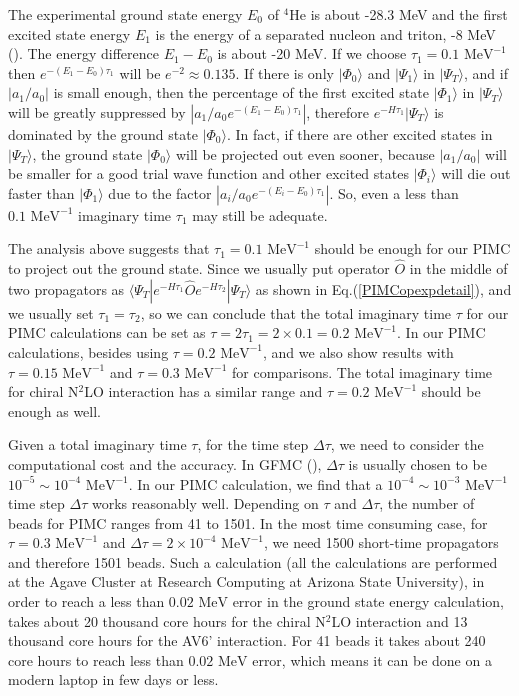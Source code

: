 \documentclass[12pt,letterpaper,UTF8]{report}
\begin{document}
The experimental ground state energy $E_0$ of $^4$He is about -28.3 MeV and the first excited state energy $E_1$ is the energy of a separated nucleon and triton, -8 MeV (\cite{Tiley92a}).
The energy difference $E_1-E_0$ is about -20 MeV.
If we choose $\tau_1=0.1 \textrm{ MeV}^{-1}$ then $e^{-(E_1-E_0)\tau_1}$ will be $e^{-2}\approx 0.135$.
If there is only $|\Phi_0\rangle$ and $|\Psi_1\rangle$ in $|\Psi_T\rangle$, and if $|a_1/a_0|$ is small enough,
then the percentage of the first excited state $|\Phi_1 \rangle$ in $|\Psi_T \rangle$ will be greatly suppressed by $|a_1/a_0 e^{-(E_1-E_0)\tau_1}|$,
therefore $e^{-H \tau_1} |\Psi_T \rangle$ is dominated by the ground state $|\Phi_0 \rangle$.
In fact, if there are other excited states in $|\Psi_T \rangle$, the ground state $|\Phi_0 \rangle$ will be projected out even sooner, because $|a_1/a_0|$ will be smaller for a good trial wave function and other excited states $|\Phi_i\rangle$ will die out faster than $|\Phi_1\rangle$ due to the factor $|a_i/a_0 e^{-(E_i-E_0)\tau_1}|$.
So, even a less than $0.1 \textrm{ MeV}^{-1}$ imaginary time $\tau_1$ may still be adequate.



The analysis above suggests that $\tau_1=0.1 \textrm{ MeV}^{-1}$ should be enough for our PIMC to project out the ground state.
Since we usually put operator $\hat{O}$ in the middle of two propagators as $\langle \Psi_T| e^{-H \tau_1}  \hat{O} e^{-H \tau_2} | \Psi_T \rangle $ as shown in Eq.(\ref{PIMCopexpdetail}), and we usually set $\tau_1=\tau_2$, so we can conclude that the total imaginary time $\tau$ for our PIMC calculations can be set as $\tau=2\tau_1=2\times 0.1=0.2 \textrm{ MeV}^{-1}$.
In our PIMC calculations, besides using $\tau=0.2 \textrm{ MeV}^{-1}$, and we also show results with $\tau=0.15 \textrm{ MeV}^{-1}$ and $\tau=0.3 \textrm{ MeV}^{-1}$ for comparisons.
The total imaginary time for chiral N$^2$LO interaction has a similar range and $\tau=0.2 \textrm{ MeV}^{-1}$ should be enough as well.

Given a total imaginary time $\tau$, for the time step $\Delta \tau$, we need to consider the computational cost and the accuracy.
In GFMC (\cite{Carlson87a}), $\Delta \tau$ is usually chosen to be $10^{-5} \sim 10^{-4} \textrm{ MeV}^{-1}$.
In our PIMC calculation, we find that a $10^{-4} \sim 10^{-3} \textrm{ MeV}^{-1}$ time step $\Delta \tau$ works reasonably well.
Depending on $\tau$ and $\Delta \tau$, the number of beads for PIMC ranges from 41 to 1501.
In the most time consuming case, for $\tau=0.3 \textrm{ MeV}^{-1}$ and $\Delta \tau=2\times 10^{-4} \textrm{ MeV}^{-1}$, we need 1500 short-time propagators and therefore 1501 beads.
Such a calculation (all the calculations are performed at the Agave Cluster at Research Computing at Arizona State University),
in order to reach a less than $0.02\textrm{ MeV}$ error in the ground state energy calculation, takes about 20 thousand core hours for the chiral N$^2$LO interaction and 13 thousand core hours for the AV6' interaction.
For 41 beads it takes about 240 core hours to reach less than $0.02\textrm{ MeV}$ error, which means it can be done on a modern laptop in few days or less.
\end{document}
